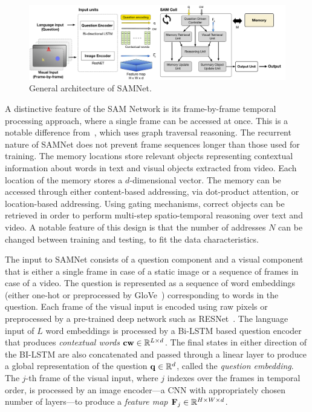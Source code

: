\begin{figure}
	\centering
	\includegraphics[width=\textwidth]{../img/architecture/SAMNETmodel}
	\caption{General architecture of SAMNet.}
	\label{fig:samnet}
\end{figure}

A distinctive feature of the SAM Network is its frame-by-frame temporal processing approach, where a single frame can be accessed at once. This is a notable difference from~\cite{haurilet2019s}, which uses graph traversal reasoning. The recurrent nature of SAMNet does not prevent frame sequences longer than those used for training.
The memory locations store relevant objects representing contextual information about words in text and visual objects extracted from video.
Each location of the memory stores a $d$-dimensional vector. %
The memory can be accessed through either content-based addressing, via dot-product attention, or location-based addressing. Using gating mechanisms, correct objects can be retrieved in order to perform multi-step spatio-temporal reasoning over text and video.
A notable feature of this design is that the number of addresses $N$ can be changed between training and testing, to fit the data characteristics.


The input to SAMNet consists of a question component and a visual component that is either a single frame in case of a static image or a sequence of frames in case of a video.
The question is represented as a sequence of word embeddings (either one-hot or preprocessed by GloVe~\cite{pennington2014glove}) corresponding to words in the question.
Each frame of the visual input is encoded using raw pixels or preprocessed by a pre-trained deep network such as RESNet~\cite{he2016deep}.
The language input of $L$ word embeddings is processed by a Bi-LSTM based question encoder that produces \emph{contextual words} $\mathbf{cw} \in \mathbb{R}^{L \times d}$.
The final states in either direction of the BI-LSTM are also concatenated and passed through a linear layer to produce a global representation of the question 
$\mathbf{q} \in \mathbb{R}^d$, called the \emph{question embedding}.
The $j$-th frame of the visual input, where $j$ indexes over the frames in temporal order, is processed by an image encoder---a CNN with appropriately chosen number of layers---to produce a \emph{feature map} 
$\mathbf{F}_j \in \mathbb{R}^{H \times W \times d}$.

